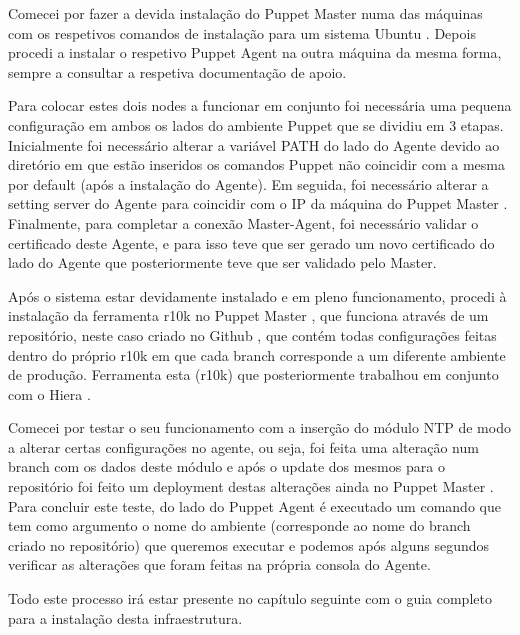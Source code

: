 \documentclass{article}
\begin{document}
Comecei por fazer a devida instalação do Puppet Master \cite{puppet-master} numa das máquinas com os respetivos comandos de instalação para um sistema Ubuntu \cite{ubuntu}. Depois procedi a instalar o respetivo Puppet Agent \cite{puppet-agent} na outra máquina da mesma forma, sempre a consultar a respetiva documentação de apoio.

Para colocar estes dois nodes a funcionar em conjunto foi necessária uma pequena configuração em ambos os lados do ambiente Puppet \cite{puppet} que se dividiu em 3 etapas. Inicialmente foi necessário alterar a variável PATH do lado do Agente devido ao diretório em que estão inseridos os comandos Puppet \cite{puppet} não coincidir com a mesma por default (após a instalação do Agente). Em seguida, foi necessário alterar a setting server do Agente para coincidir com o IP da máquina do Puppet Master \cite{puppet-master}. Finalmente, para completar a conexão Master-Agent, foi necessário validar o certificado deste Agente, e para isso teve que ser gerado um novo certificado do lado do Agente que posteriormente teve que ser validado pelo Master.

Após o sistema estar devidamente instalado e em pleno funcionamento, procedi à instalação da ferramenta r10k no Puppet Master \cite{puppet-master}, que funciona através de um repositório, neste caso criado no Github \cite{github}, que contém todas configurações feitas dentro do próprio r10k \cite{r10k} em que cada branch corresponde a um diferente ambiente de produção. Ferramenta esta (r10k) que posteriormente trabalhou em conjunto com o Hiera \cite{hiera}. 

Comecei por testar o seu funcionamento com a inserção do módulo NTP \cite{ntp} de modo a alterar certas configurações no agente, ou seja, foi feita uma alteração num branch com os dados deste módulo e após o update dos mesmos para o repositório foi feito um deployment destas alterações ainda no Puppet Master \cite{puppet-master}. Para concluir este teste, do lado do Puppet Agent \cite{puppet-agent} é executado um comando que tem como argumento o nome do ambiente (corresponde ao nome do branch criado no repositório) que queremos executar e podemos após alguns segundos verificar as alterações que foram feitas na própria consola do Agente.

Todo este processo irá estar presente no capítulo seguinte com o guia completo para a instalação desta infraestrutura.
\end{document}

